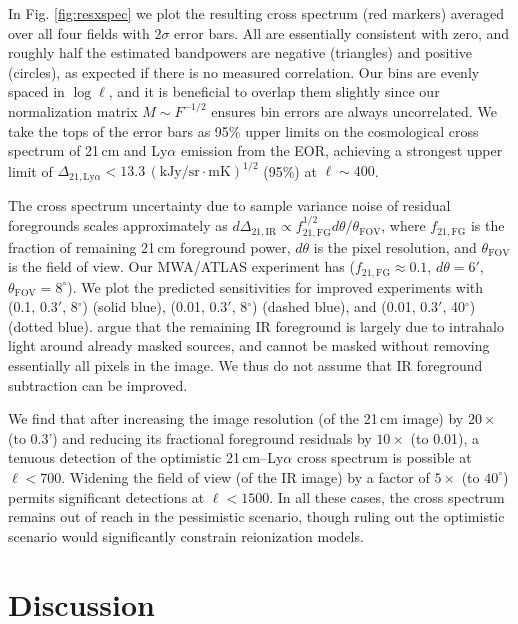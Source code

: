\documentclass{emulateapj}
\newcommand{\IR}{\text{IR}}
\begin{document}
In Fig. \ref{fig:resxspec} we plot the resulting cross spectrum (red markers) averaged over all four fields with $2\sigma$ error bars. All are essentially consistent with zero, and roughly half the estimated bandpowers are negative (triangles) and positive (circles), as expected if there is no measured correlation. Our bins are evenly spaced in $\log \ell$, and it is beneficial to overlap them slightly since our normalization matrix $M\sim F^{-1/2}$ ensures bin errors are always uncorrelated. We take the tops of the error bars as 95\% upper limits on the cosmological cross spectrum of 21\,cm and Ly$\alpha$ emission from the EOR, achieving a strongest upper limit of $\Delta_{21,\text{Ly}\alpha}<13.3\,(\text{kJy/sr}\cdot \text{mK})^{1/2}$ (95\%) at $\ell\sim400$. 

The cross spectrum uncertainty due to sample variance noise of residual foregrounds scales approximately as $d\Delta_{21,\IR}\propto f_{21,\text{FG}}^{1/2}d\theta/\theta_{\text{FOV}}$, where $f_{21,\text{FG}}$ is the fraction of remaining 21\,cm foreground power, $d\theta$ is the pixel resolution, and $\theta_{\text{FOV}}$ is the field of view. Our MWA/ATLAS experiment has ($f_{21,\text{FG}}\approx0.1$, $d\theta=6'$, $\theta_{\text{FOV}}=8^\circ$). We plot the predicted sensitivities for improved experiments with (0.1, $0.3'$, 8$^\circ$) (solid blue), (0.01, $0.3'$, 8$^\circ$) (dashed blue), and (0.01, $0.3'$, 40$^\circ$) (dotted blue). \citet{zemcov14,cooray12} argue that the remaining IR foreground is largely due to intrahalo light around already masked sources, and cannot be masked without removing essentially all pixels in the image. We thus do not assume that IR foreground subtraction can be improved.

We find that after increasing the image resolution (of the 21\,cm image) by $20\times$ (to 0.3') and reducing its fractional foreground residuals by $10\times$ (to 0.01), a tenuous detection of the optimistic 21\,cm--Ly$\alpha$ cross spectrum is possible at $\ell<700$. Widening the field of view (of the IR image) by a factor of $5\times$ (to $40^\circ$) permits significant detections at $\ell<1500$. In all these cases, the cross spectrum remains out of reach in the pessimistic scenario, though ruling out the optimistic scenario would significantly constrain reionization models.

\section{Discussion}
\end{document}

